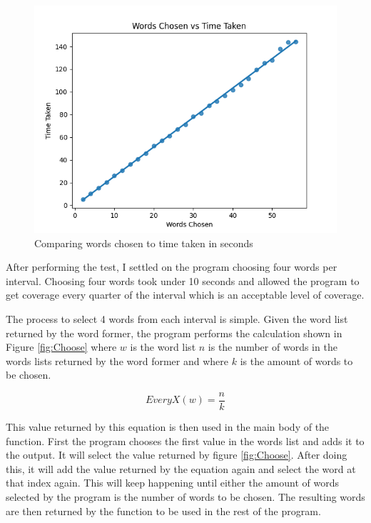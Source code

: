\documentclass[10pt,a4paper]{report}
\begin{document}
\begin{figure}
	\centering
	\includegraphics[scale=0.70]{WordsChosenVsTime}
	\caption{Comparing words chosen to time taken in seconds}
	\label{fig:WordsvsTime}
\end{figure}

After performing the test, I settled on the program choosing four words per interval. Choosing four words took under 10 seconds and allowed the program to get coverage every quarter of the interval which is an acceptable level of coverage.

The process to select 4 words from each interval is simple. Given the word list returned by the word former, the program performs the calculation shown in Figure \ref{fig:Choose} where \(w\) is the word list \(n\) is the number of words in the words lists returned by the word former and where \(k\) is the amount of words to be chosen.

\begin{equation}
\textit{EveryX}(w) = \frac{n}{k}
\label{fig:Choose}
\end{equation}

This value returned by this equation is then used in the main body of the function. First the program chooses the first value in the words list and adds it to the output. It will select the value returned by figure \ref{fig:Choose}. After doing this, it will add the value returned by the equation again and select the word at that index again. This will keep happening until either the amount of words selected by the program is the number of words to be chosen. The resulting words are then returned by the function to be used in the rest of the program. 
\end{document}
